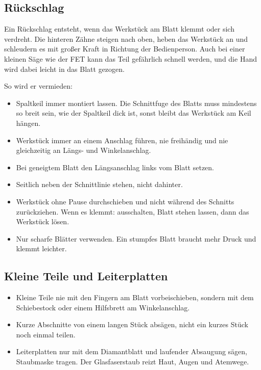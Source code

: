 \documentclass{\basedir/fablab-document}
\begin{document}
	\subsection{Rückschlag}
	Ein Rückschlag entsteht, wenn das Werkstück am Blatt klemmt oder sich verdreht. Die hinteren Zähne steigen nach oben, heben das Werkstück an und schleudern es mit großer Kraft in Richtung der Bedienperson. Auch bei einer kleinen Säge wie der FET kann das Teil gefährlich schnell werden, und die Hand wird dabei leicht in das Blatt gezogen.

	\begin{center}
		
	\end{center}

	So wird er vermieden:
	\begin{itemize}
		\item Spaltkeil immer montiert lassen. Die Schnittfuge des Blatts muss mindestens so breit sein, wie der Spaltkeil dick ist, sonst bleibt das Werkstück am Keil hängen.
		\item Werkstück immer an einem Anschlag führen, nie freihändig und nie gleichzeitig an Längs- und Winkelanschlag.
		\item Bei geneigtem Blatt den Längsanschlag links vom Blatt setzen.
		\item Seitlich neben der Schnittlinie stehen, nicht dahinter.
		\item Werkstück ohne Pause durchschieben und nicht während des Schnitts zurückziehen. Wenn es klemmt: ausschalten, Blatt stehen lassen, dann das Werkstück lösen.
		\item Nur scharfe Blätter verwenden. Ein stumpfes Blatt braucht mehr Druck und klemmt leichter.
	\end{itemize}

	\subsection{Kleine Teile und Leiterplatten}
	\begin{itemize}
		\item Kleine Teile nie mit den Fingern am Blatt vorbeischieben, sondern mit dem Schiebestock oder einem Hilfsbrett am Winkelanschlag.
		\item Kurze Abschnitte von einem langen Stück absägen, nicht ein kurzes Stück noch einmal teilen.
		\item Leiterplatten nur mit dem Diamantblatt und laufender Absaugung sägen, Staubmaske tragen. Der Glasfaserstaub reizt Haut, Augen und Atemwege.
	\end{itemize}
\end{document}

